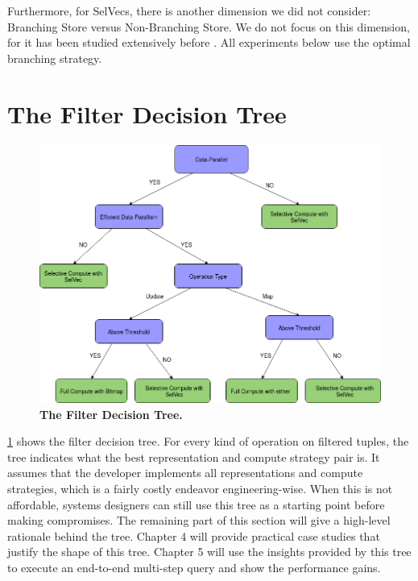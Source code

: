 \documentclass[12pt]{cmuthesis}
\begin{document}
Furthermore, for SelVecs, there is another dimension we did not consider: Branching Store versus Non-Branching Store. We do not focus on this dimension, for it has been studied extensively before \cite{miro_adapt}. All experiments below use the optimal branching strategy.

\section{The Filter Decision Tree}
\begin{figure}[t!]
    \centering
    \includegraphics[scale=0.5]{images/DecisionTree.png}
    \caption{\textbf{The Filter Decision Tree.}}
    \label{fig:filter_decision_tree}
\end{figure}
\cref{fig:filter_decision_tree} shows the filter decision tree. For every kind of operation on filtered tuples, the tree indicates what the best representation and compute strategy pair is. It assumes that the developer implements all representations and compute strategies, which is a fairly costly endeavor engineering-wise. When this is not affordable, systems designers can still use this tree as a starting point before making compromises. The remaining part of this section will give a high-level rationale behind the tree. Chapter 4 will provide practical case studies that justify the shape of this tree. Chapter 5 will use the insights provided by this tree to execute an end-to-end multi-step query and show the performance gains.
\end{document}
